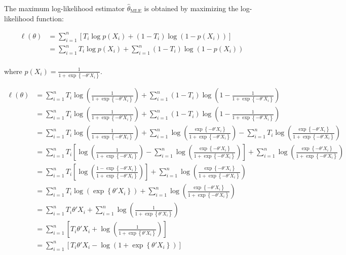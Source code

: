 \documentclass{article}
\begin{document}
The maximum log-likelihood estimator \( \hat{\theta}_{\text{MLE}} \) is obtained by maximizing the log-likelihood function:

\begin{align*}
  \ell(\theta)
  &= \sum_{i=1}^n \left[ T_i \log p(X_i) + (1 - T_i) \log (1 - p(X_i)) \right] \\
  &= \sum_{i=1}^n T_i \log p(X_i) + \sum_{i=1}^n (1 - T_i) \log (1 - p(X_i)) \\
\end{align*}

where \( p(X_i) = \frac{1}{1 + \exp\left\{ - \theta' X_i \right\}} \).

\begin{align*}
  \ell(\theta)
  &= \sum_{i=1}^n T_i \log \left( \frac{1}{1 + \exp\left\{ - \theta' X_i \right\}} \right) + \sum_{i=1}^n (1 - T_i) \log \left( 1 - \frac{1}{1 + \exp\left\{ - \theta' X_i \right\}} \right) \\
  &= \sum_{i=1}^n T_i \log \left( \frac{1}{1 + \exp\left\{ - \theta' X_i \right\}} \right) + \sum_{i=1}^n (1 - T_i) \log \left( 1 - \frac{1}{1 + \exp\left\{ - \theta' X_i \right\}} \right) \\
  &= \sum_{i=1}^n T_i \log \left( \frac{1}{1 + \exp\left\{ - \theta' X_i \right\}} \right)
    + \sum_{i=1}^n \log \left( \frac{\exp\left\{ - \theta' X_i \right\}}{1 + \exp\left\{ - \theta' X_i \right\}} \right)
    - \sum_{i=1}^n T_i \log \left(\frac{\exp\left\{ - \theta' X_i \right\}}{1 + \exp\left\{ - \theta' X_i \right\}} \right) \\
  &= \sum_{i=1}^n T_i \left[ \log \left( \frac{1}{1 + \exp\left\{ - \theta' X_i \right\}} \right)
    - \sum_{i=1}^n \log \left(\frac{\exp\left\{ - \theta' X_i \right\}}{1 + \exp\left\{ - \theta' X_i \right\}} \right) \right]
    + \sum_{i=1}^n \log \left( \frac{\exp\left\{ - \theta' X_i \right\}}{1 + \exp\left\{ - \theta' X_i \right\}} \right) \\
  &= \sum_{i=1}^n T_i
    \left[
      \log \left( \frac{1 - \exp\left\{ - \theta' X_i \right\}}{1 + \exp\left\{ - \theta' X_i \right\}} \right)
    \right]
    + \sum_{i=1}^n \log \left( \frac{\exp\left\{ - \theta' X_i \right\}}{1 + \exp\left\{ - \theta' X_i \right\}} \right) \\
  &= \sum_{i=1}^n T_i
      \log \left( \exp\left\{ \theta' X_i \right\} \right)
    + \sum_{i=1}^n \log \left( \frac{\exp\left\{ - \theta' X_i \right\}}{1 + \exp\left\{ - \theta' X_i \right\}} \right) \\
  &= \sum_{i=1}^n T_i \theta' X_i 
    + \sum_{i=1}^n \log \left( \frac{1}{1 + \exp\left\{ \theta' X_i \right\}} \right) \\
  &= \sum_{i=1}^n
    \left[
      T_i \theta' X_i + \log \left( \frac{1}{1 + \exp\left\{ \theta' X_i \right\}} \right)
    \right]
    \\
  &= \sum_{i=1}^n
    \left[
      T_i \theta' X_i - \log \left( 1 + \exp\left\{ \theta' X_i \right\} \right)
    \right]
    \\
\end{align*}
\end{document}
